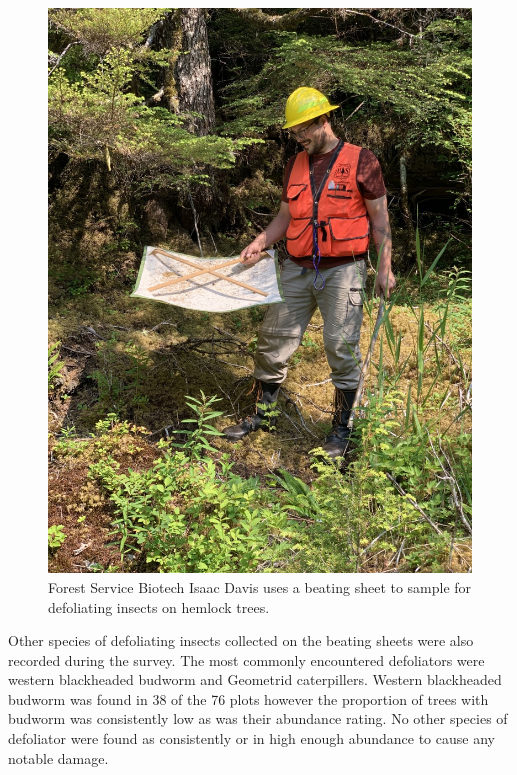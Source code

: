 \begin{multicols}{2}
\begin{figure}[H]
\begin{center}
\vspace{2mm}
\includegraphics[width=\textwidth]{img/beating_sheet.jpg}
\caption{Forest Service Biotech Isaac Davis uses a beating sheet to sample for defoliating insects on hemlock trees.}
\label{beating_sheet}
\end{center}
\end{figure} 

Other species of defoliating insects collected on the beating sheets were also recorded during the survey.  The most commonly encountered defoliators were western blackheaded budworm and Geometrid caterpillers.  Western blackheaded budworm was found in 38 of the 76 plots however the proportion of trees with budworm was consistently low as was their abundance rating.  No other species of defoliator were found as consistently or in high enough abundance to cause any notable damage. 
 

\end{multicols}
